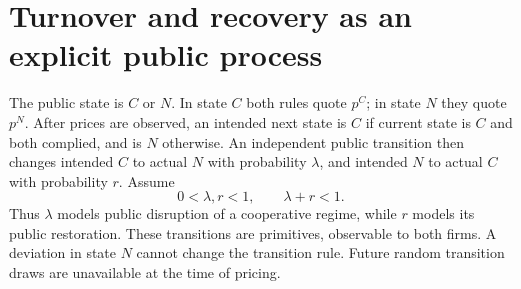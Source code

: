 \documentclass[11pt,a4paper]{article}
\theoremstyle{remark}
\begin{document}
\section{Turnover and recovery as an explicit public process}
The public state is $C$ or $N$. In state $C$ both rules quote $p^C$; in state $N$ they quote $p^N$. After prices are observed, an intended next state is $C$ if current state is $C$ and both complied, and is $N$ otherwise. An independent public transition then changes intended $C$ to actual $N$ with probability $\lambda$, and intended $N$ to actual $C$ with probability $r$. Assume
\[
 0<\lambda,r<1,\qquad \lambda+r<1.
\]
Thus $\lambda$ models public disruption of a cooperative regime, while $r$ models its public restoration. These transitions are primitives, observable to both firms. A deviation in state $N$ cannot change the transition rule. Future random transition draws are unavailable at the time of pricing.
\end{document}
